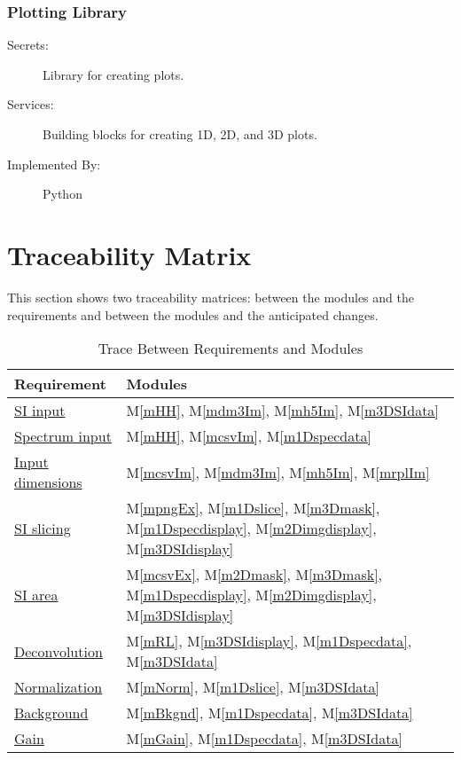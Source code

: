 \documentclass[12pt, titlepage]{article}
\newcommand{\mref}[1]{M\ref{#1}}
\begin{document}
\subsubsection{Plotting Library}
\begin{description}
	\item[Secrets:]Library for creating plots.
	\item[Services:]Building blocks for creating 1D, 2D, and 3D plots.
	\item[Implemented By:] Python
\end{description}

\section{Traceability Matrix} \label{SecTM}

This section shows two traceability matrices: between the modules and the
requirements and between the modules and the anticipated changes.

\begin{table}[H]
	\centering
	\begin{tabular}{p{} p{}}
		\toprule
		\textbf{Requirement} & \textbf{Modules}\\
		\midrule
		\hyperref[R_SI_inputs]{SI input} & \mref{mHH}, \mref{mdm3Im}, \mref{mh5Im},
\mref{m3DSIdata}\\
		\hyperref[R_spectrum_inputs]{Spectrum input} & \mref{mHH}, \mref{mcsvIm},
\mref{m1Dspecdata}\\
		\hyperref[R_Input_dimension]{Input dimensions} & \mref{mcsvIm}, \mref{mdm3Im},
\mref{mh5Im}, \mref{mrplIm}\\
		\hyperref[R_SI_slicing]{SI slicing} & \mref{mpngEx}, \mref{m1Dslice},
\mref{m3Dmask}, \mref{m1Dspecdisplay}, \mref{m2Dimgdisplay},
\mref{m3DSIdisplay}\\
		\hyperref[R_SI_area]{SI area} & \mref{mcsvEx}, \mref{m2Dmask}, \mref{m3Dmask},
\mref{m1Dspecdisplay}, \mref{m2Dimgdisplay}, \mref{m3DSIdisplay}\\
		\hyperref[R_deconvolution]{Deconvolution} & \mref{mRL}, \mref{m3DSIdisplay},
\mref{m1Dspecdata}, \mref{m3DSIdata}\\
		\hyperref[R_normalization]{Normalization} & \mref{mNorm}, \mref{m1Dslice},
\mref{m3DSIdata}\\
		\hyperref[R_background]{Background} & \mref{mBkgnd}, \mref{m1Dspecdata},
\mref{m3DSIdata}\\
		\hyperref[R_gain]{Gain} & \mref{mGain}, \mref{m1Dspecdata}, \mref{m3DSIdata}\\
		\bottomrule
	\end{tabular}
	\caption{Trace Between Requirements and Modules}
	\label{TblRT}
\end{table}
\end{document}
